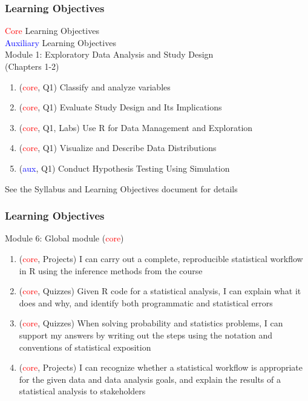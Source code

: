 \documentclass[11pt,containsverbatim,handout]{beamer}
\begin{document}

\begin{frame}
	\frametitle{Learning Objectives} %

	\textcolor{red}{Core} Learning Objectives \\
	\textcolor{blue}{Auxiliary} Learning Objectives \\

	\vspace{10pt}
	Module 1: Exploratory Data Analysis and Study Design \\(Chapters 1-2)
	\begin{enumerate}
		\item (\textcolor{red}{core}, Q1) Classify and analyze variables 
		\item (\textcolor{red}{core}, Q1) Evaluate Study Design and Its Implications 
		\item (\textcolor{red}{core}, Q1, Labs) Use R for Data Management and Exploration
		\item (\textcolor{red}{core}, Q1) Visualize and Describe Data Distributions 
		\item (\textcolor{blue}{aux}, Q1) Conduct Hypothesis Testing Using Simulation 
	\end{enumerate}
	See the Syllabus and Learning Objectives document for details
\end{frame}

\begin{frame} %
	\frametitle{Learning Objectives}
	Module 6: Global module (\textcolor{red}{core})
	\begin{enumerate}
		\item (\textcolor{red}{core}, Projects) I can carry out a complete, reproducible statistical workflow in R using the inference methods from the course  
		\item (\textcolor{red}{core}, Quizzes) Given R code for a statistical analysis, I can explain what it does and why, and identify both programmatic and statistical errors 
		\item (\textcolor{red}{core}, Quizzes) When solving probability and statistics problems, I can support my answers by writing out the steps using the notation and conventions of statistical exposition  
		\item (\textcolor{red}{core}, Projects) I can recognize whether a statistical workflow is appropriate for the given data and data analysis goals, and explain the results of a statistical analysis to stakeholders
	\end{enumerate}
\end{frame}
\end{document}
